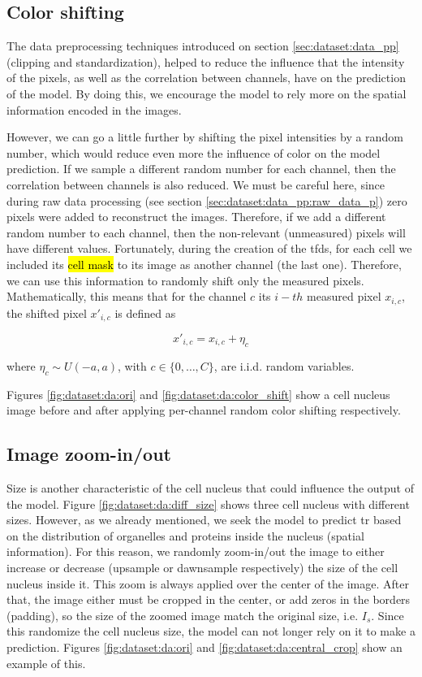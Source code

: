 \subsection{Color shifting}

The data preprocessing techniques introduced on section \ref{sec:dataset:data_pp} (clipping and standardization), helped to reduce the influence that the intensity of the pixels, as well as the correlation between channels, have on the prediction of the model. By doing this, we encourage the model to rely more on the spatial information encoded in the images.

However, we can go a little further by shifting the pixel intensities by a random number, which would reduce even more the influence of color on the model prediction. If we sample a different random number for each channel, then the correlation between channels is also reduced. We must be careful here, since during raw data processing (see section \ref{sec:dataset:data_pp:raw_data_p}) zero pixels were added to reconstruct the images. Therefore, if we add a different random number to each channel, then the non-relevant (unmeasured) pixels will have different values. Fortunately, during the creation of the \gls{tfds}, for each cell we included its \hl{cell mask} to its image as another channel (the last one). Therefore, we can use this information to randomly shift only the measured pixels. Mathematically, this means that for the channel $c$ its $i-th$ measured pixel $x_{i,c}$, the shifted pixel $x'_{i,c}$ is defined as

\begin{equation}
  x'_{i,c} = x_{i,c} + \eta_c
\end{equation}

\noindent where $\eta_c \sim U(-a, a)$, with $c\in\{0, \dots, C\}$, are i.i.d. random variables.

Figures \ref{fig:dataset:da:ori} and \ref{fig:dataset:da:color_shift} show a cell nucleus image before and after applying per-channel random color shifting respectively.

\subsection{Image zoom-in/out}
\label{sec:dataset:data_aug:zoom}

Size is another characteristic of the cell nucleus that could influence the output of the model. Figure \ref{fig:dataset:da:diff_size} shows three cell nucleus with different sizes. However, as we already mentioned, we seek the model to predict \gls{tr} based on the distribution of organelles and proteins inside the nucleus (spatial information). For this reason, we randomly zoom-in/out the image to either increase or decrease (upsample or dawnsample respectively) the size of the cell nucleus inside it. This zoom is always applied over the center of the image. After that, the image either must be cropped in the center, or add zeros in the borders (padding), so the size of the zoomed image match the original size, i.e. $I_s$. Since this randomize the cell nucleus size, the model can not longer rely on it to make a prediction. Figures \ref{fig:dataset:da:ori} and \ref{fig:dataset:da:central_crop} show an example of this.

